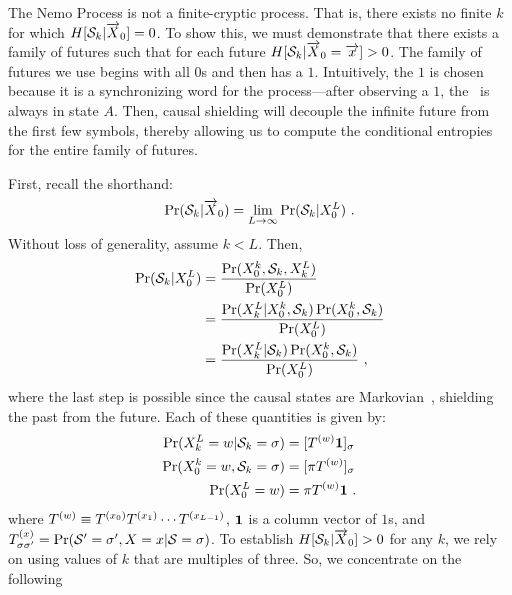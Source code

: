 The Nemo Process is not a finite-cryptic process. That is, there exists no 
finite $k$ for which $H[\mathcal{S}_k | \smash{\overrightarrow{{X}}}_0] = 0$. To show this,
we must demonstrate that there exists a family of futures such that for each 
future \mbox{$H[\mathcal{S}_k | \smash{\overrightarrow{{X}}}_0 = \smash{\overrightarrow{{x}}}] > 0$}.  The family 
of futures we use begins with all $0$s and then has a $1$. Intuitively, 
the $1$ is chosen because it is a synchronizing word for the 
process---after observing a $1$, the \eM\ is 
always in state $A$.  Then, causal shielding will decouple the infinite
future from the first few symbols, thereby allowing us to compute the
conditional entropies for the entire family of futures.

First, recall 
the shorthand:
\begin{align*}
\Pr(\mathcal{S}_k | \smash{\overrightarrow{{X}}}_0) = 
 \lim_{L\rightarrow\infty} \Pr(\mathcal{S}_k | {X}_0^L) ~.
\end{align*}
Without loss of generality, assume $k < L$. Then,
\begin{align*}
\Pr(\mathcal{S}_k | {X}_0^L) 
   &= \frac{\Pr({X}_0^k, \mathcal{S}_k, {X}_k^L)}
           {\Pr({X}_0^L)} \\
   &= \frac{\Pr({X}_k^L | {X}_0^k, \mathcal{S}_k)
\Pr({X}_0^k, \mathcal{S}_k)} 
           {\Pr({X}_0^L)} \\
   &= \frac{\Pr({X}_k^L | \mathcal{S}_k)
\Pr({X}_0^k, \mathcal{S}_k)} 
           {\Pr({X}_0^L)}  ~,
\end{align*}
where the last step is possible since the causal states are
Markovian~\cite{Crut98d},
shielding the past from the future. Each of these quantities is given by:
\begin{align*}
\Pr({X}_k^L = w | \mathcal{S}_k = \sigma) &=
[T^{(w)}\mathbf{1}]_{\sigma}\\
\Pr({X}_0^k=w, \mathcal{S}_k = \sigma) &= [\pi
T^{(w)}]{}_\sigma \\
\Pr({X}_0^L=w) &= \pi T^{(w)} \mathbf{1} ~.
\end{align*}
where $T^{(w)} \equiv T^{({x}_0)}T^{({x}_1)}\cdots
T^{({x}_{L-1})}$, $\mathbf{1}$ is a column vector of $1$s, and
$T^{({x})}_{\sigma{\sigma^{\prime}}} = 
\Pr({\mathcal{S}}^{\prime} = {\sigma^{\prime}}, 
    {X}={x} | \mathcal{S}=\sigma)$.
To establish $H[\mathcal{S}_k | \smash{\overrightarrow{{X}}}_0] > 0$ for any $k$, we rely on using
values of $k$ that are multiples of three. So, we concentrate on the following
